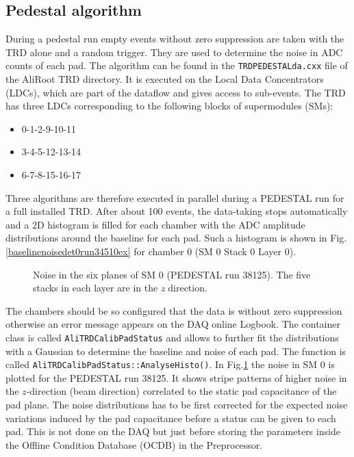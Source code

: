 \documentclass{alicetdr}
\begin{document}
\subsection{Pedestal algorithm}
During a pedestal run empty events without zero suppression are taken
with the TRD alone and a random trigger. They are used to determine
the noise in ADC counts of each pad. The algorithm can be found in the
{\tt TRDPEDESTALda.cxx} file of the AliRoot TRD directory. It is
executed on the Local Data Concentrators (LDCs), which are part of the
dataflow and gives access to sub-events. The TRD has three LDCs
corresponding to the following blocks of supermodules (SMs):
\begin{itemize}
\item 0-1-2-9-10-11
\item 3-4-5-12-13-14
\item 6-7-8-15-16-17
\end{itemize}
Three algorithms are therefore executed in parallel during a PEDESTAL
run for a full installed TRD. After about 100 events, the data-taking
stops automatically and a 2D histogram is filled for each chamber with
the ADC amplitude distributions around the baseline for each pad. Such
a histogram is shown in Fig.\ref{baselinenoisedet0run34510ex} for
chamber 0 (SM 0 Stack 0 Layer 0).
\begin{figure}[h]
  \centering\mbox{}
  \caption{\label{run38125sm0nounfold}Noise in the six planes of
SM 0 (PEDESTAL run 38125). The five stacks in each layer are in
the {\it{z}} direction.}
\end{figure}
The chambers should be so configured that the data is without zero
suppression otherwise an error message appears on the DAQ online
Logbook. The container class is called {\tt AliTRDCalibPadStatus}
and allows to further fit the distributions with a Gaussian to
determine the baseline and noise of each pad. The function is called
{\tt AliTRDCalibPadStatus::AnalyseHisto()}. In
Fig.\ref{run38125sm0nounfold} the noise in SM 0 is plotted for the
PEDESTAL run 38125. It shows stripe patterns of higher noise in the
$z$-direction (beam direction) correlated to the static pad capacitance
of the pad plane. The noise distributions has to be first corrected
for the expected noise variations induced by the pad capacitance
before a status can be given to each pad. This is not done on the DAQ
but just before storing the parameters inside the Offline Condition
Database (OCDB) in the Preprocessor.
\end{document}
